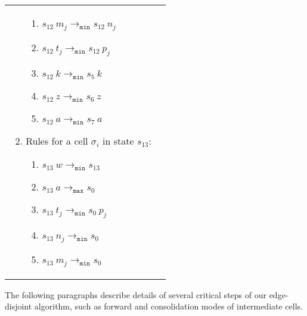 \documentclass[preliminary,copyright,creativecommons]{eptcs}
\theoremstyle{remark}
\newcommand{\modmin}{\mathtt{min}}
\newcommand{\modmax}{\mathtt{max}}
\begin{document}
\begin{tabular}[t]{ll}
\begin{minipage}[t]{3.0in}
\begin{enumerate}
\begin{enumerate}[1]
    \item $s_{12}~ m_j \rightarrow_{\modmin} s_{12}~ n_j$
    \item $s_{12}~ t_j \rightarrow_{\modmin} s_{12}~ p_j$

    \item $s_{12}~ k \rightarrow_{\modmin} s_5~ k$
    \item $s_{12}~ z \rightarrow_{\modmin} s_6~ z$
    \item $s_{12}~ a \rightarrow_{\modmin} s_7~ a$
    \end{enumerate}

  \item Rules for a cell $\sigma_i$ in state $s_{13}$:
    \begin{enumerate}[1]
    \item $s_{13}~ w \rightarrow_{\modmin} s_{13}$

    \item $s_{13}~ a \rightarrow_{\modmax} s_0$

    \item $s_{13}~ t_j \rightarrow_{\modmin} s_0~ p_j$
    \item $s_{13}~ n_j \rightarrow_{\modmin} s_0$
    \item $s_{13}~ m_j \rightarrow_{\modmin} s_0$

    \end{enumerate}

  \end{enumerate}
  \end{minipage}
\end{tabular}

The following paragraphs describe details of several critical steps of our edge-disjoint algorithm, such as forward and consolidation modes of intermediate cells.
\end{document}
